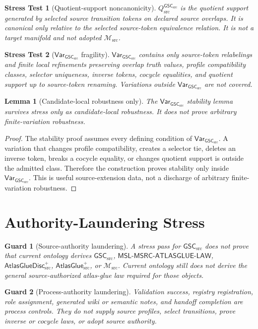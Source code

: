 \documentclass[11pt]{article}
\newcommand{\Msrc}{\mathcal{M}_{\mathrm{src}}}
\newcommand{\AtlasGlue}{\mathsf{AtlasGlue}_{\mathrm{src}}^{+}}
\newcommand{\AtlasGlueDisc}{\mathsf{AtlasGlueDisc}_{\mathrm{src}}^{+}}
\newcommand{\MSL}{\mathsf{MSL}\mbox{-}\mathsf{MSRC}\mbox{-}\mathsf{ATLASGLUE}\mbox{-}\mathsf{LAW}}
\newcommand{\GSC}{\mathsf{GSC}_{\mathrm{src}}}
\newcommand{\Vargsc}{\mathsf{Var}_{\GSC}}
\newcommand{\Qsrc}{Q_{\mathrm{src}}^{\GSC}}
\newtheorem{stress}{Stress Test}
\newtheorem{lemma}{Lemma}
\newtheorem{guard}{Guard}
\begin{document}
\begin{stress}[Quotient-support noncanonicity]
\(\Qsrc\) is the quotient support generated by selected source transition
tokens on declared source overlaps. It is canonical only relative to the
selected source-token equivalence relation. It is not a target manifold and
not adopted \(\Msrc\).
\end{stress}

\begin{stress}[\(\Vargsc\) fragility]
\(\Vargsc\) contains only source-token relabelings and finite local
refinements preserving overlap truth values, profile compatibility classes,
selector uniqueness, inverse tokens, cocycle equalities, and quotient support
up to source-token renaming. Variations outside \(\Vargsc\) are not covered.
\end{stress}

\begin{lemma}[Candidate-local robustness only]
The \(\Vargsc\) stability lemma survives stress only as candidate-local
robustness. It does not prove arbitrary finite-variation robustness.
\end{lemma}

\begin{proof}
The stability proof assumes every defining condition of \(\Vargsc\). A
variation that changes profile compatibility, creates a selector tie, deletes
an inverse token, breaks a cocycle equality, or changes quotient support is
outside the admitted class. Therefore the construction proves stability only
inside \(\Vargsc\). This is useful source-extension data, not a discharge of
arbitrary finite-variation robustness.
\end{proof}

\section{Authority-Laundering Stress}

\begin{guard}[Source-authority laundering]
A stress pass for \(\GSC\) does not prove that current ontology derives
\(\GSC\), \(\MSL\), \(\AtlasGlueDisc\), \(\AtlasGlue\), or \(\Msrc\).
Current ontology still does not derive the general source-authorized
atlas-glue law required for those objects.
\end{guard}

\begin{guard}[Process-authority laundering]
Validation success, registry registration, role assignment, generated wiki or
semantic notes, and handoff completion are process controls. They do not
supply source profiles, select transitions, prove inverse or cocycle laws, or
adopt source authority.
\end{guard}
\end{document}
